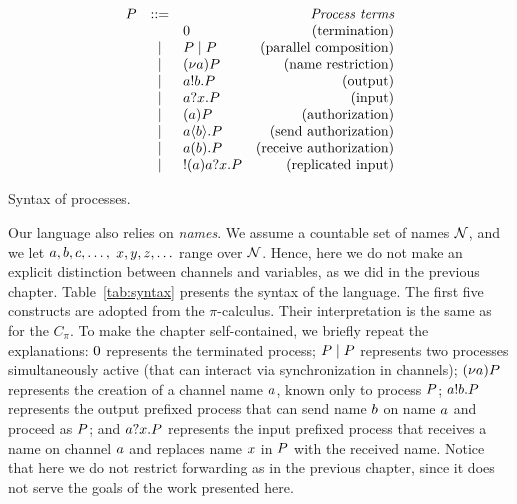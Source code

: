 %
\begin{table}[t]
\[
\displaystyle
\begin{array}[t]{@{}rcl@{\quad}r@{}}
  \PP & ::= &  &                                    \emph{Process terms} \\
  	      &        & \inact &                       \text{(termination)} \\
          & \parop & \PP\parop\PP &                 \text{(parallel composition)}\\
          & \parop & \rest\NA \PP &                 \text{(name restriction)}\\
          & \parop & \send\NA\role\msg\NB.\PP &     \text{(output)} \\
          & \parop & \receive\NA\role\msg{x}.\PP &  \text{(input)}\\
         &  \parop & \scope{\NA} \PP &              \text{(authorization)}\\
         &  \parop & \sauth\NA\role\msg\NB.\PP &    \text{(send authorization)}\\
         &  \parop & \rauth\NA\role\msg\NB.\PP &    \text{(receive authorization)}\\
         &  \parop & \repreceive\NA\role\msg{x}.\PP & \text{(replicated input)}\\
\end{array}
\]
\caption{\label{tab:syntax}Syntax of processes.}
\end{table}
%
Our language also relies on {\it names}. We assume a countable set of {names} ${\cal N}$, and we let $a, b, c, \ldots,$ $x, y, z, \ldots$ range over ${\cal N}$. Hence, here we do not make an explicit distinction between channels and variables, as we did in the previous chapter.
Table~\ref{tab:syntax} presents the syntax of the language.
The first five constructs are adopted from the $\pi$-calculus. Their interpretation is the same as for the $C_\pi$. To make the chapter self-contained, we briefly repeat the explanations: $0$ represents the terminated process; $P\;|\;P$ represents two processes simultaneously active (that can interact via synchronization in channels); $(\nu a) P$ represents the creation of a channel name $a$, known only to process $P$; $a!b.P$ represents the output prefixed process that can send name $b$ on name $a$ and proceed as $P$; and $a?x.P$ represents the input prefixed process that receives a name on channel $a$ and replaces name $x$ in $P$ with the received name. Notice that here we do not restrict forwarding as in the previous chapter, since it does not serve the goals of the work presented here.

